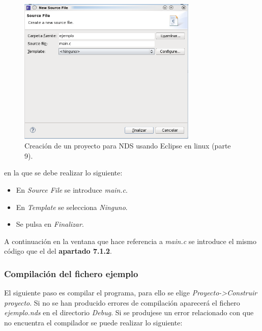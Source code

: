 \begin{figure}[t]
	\centering
	\includegraphics[height=7cm]{./Figuras/C2/c2_instan9.png}
	\caption{Creación de un proyecto para NDS usando Eclipse en linux (parte 9).}
	\label{fig_pig_p3_c1_eclipel9}
\end{figure}


\noindent en la que se debe realizar lo siguiente:
\begin{itemize}
 	\item En \textit{Source File} se introduce \textit{main.c}.
 	\item En \textit{Template} se selecciona \textit{Ninguno}.
 	\item Se pulsa en \textit{Finalizar}.
\end{itemize}

A continuación en la ventana que hace referencia a \textit{main.c} se introduce el mismo código que el del \textbf{apartado 7.1.2}.

\subsubsection{Compilación del fichero ejemplo}
El siguiente paso es compilar el programa, para ello se elige \textit{Proyecto->Construir proyecto}. Si no se han producido errores de compilación aparecerá el fichero \textit{ejemplo.nds} en el directorio \textit{Debug}. Si se produjese un error relacionado con que no encuentra el compilador se puede realizar lo siguiente:

